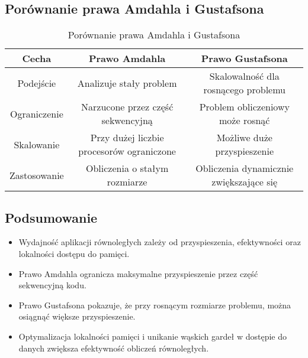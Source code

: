 \subsection{Porównanie prawa Amdahla i Gustafsona}

\begin{table}[h]
    \centering
    \renewcommand{\arraystretch}{1.3}
    \begin{tabular}{|c|c|c|}
        \hline
        \textbf{Cecha} & \textbf{Prawo Amdahla} & \textbf{Prawo Gustafsona} \\
        \hline
        Podejście & Analizuje stały problem & Skalowalność dla rosnącego problemu \\
        \hline
        Ograniczenie & Narzucone przez część sekwencyjną & Problem obliczeniowy może rosnąć \\
        \hline
        Skalowanie & Przy dużej liczbie procesorów ograniczone & Możliwe duże przyspieszenie \\
        \hline
        Zastosowanie & Obliczenia o stałym rozmiarze & Obliczenia dynamicznie zwiększające się \\
        \hline
    \end{tabular}
    \caption{Porównanie prawa Amdahla i Gustafsona}
\end{table}

\subsection{Podsumowanie}
\begin{itemize}
    \item Wydajność aplikacji równoległych zależy od przyspieszenia, efektywności oraz lokalności dostępu do pamięci.
    \item Prawo Amdahla ogranicza maksymalne przyspieszenie przez część sekwencyjną kodu.
    \item Prawo Gustafsona pokazuje, że przy rosnącym rozmiarze problemu, można osiągnąć większe przyspieszenie.
    \item Optymalizacja lokalności pamięci i unikanie wąskich gardeł w dostępie do danych zwiększa efektywność obliczeń równoległych.
\end{itemize}
